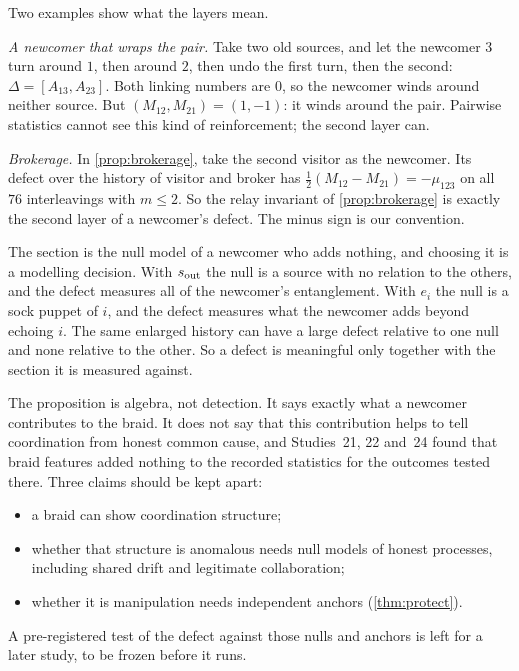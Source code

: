 \documentclass[11pt]{article}
\theoremstyle{definition}\newtheorem{definition}[theorem]{Definition}\newtheorem{remark}[theorem]{Remark}\newtheorem{example}[theorem]{Example}\newtheorem{problem}[theorem]{Open problem}\crefname{problem}{Problem}{Problems}
\begin{document}
Two examples show what the layers mean.

\emph{A newcomer that wraps the pair.} Take two old sources, and let the newcomer $3$ turn around $1$, then around $2$, then undo the first turn, then the second: $\Delta=[A_{13},A_{23}]$. Both linking numbers are $0$, so the newcomer winds around neither source. But $(M_{12},M_{21})=(1,-1)$: it winds around the pair. Pairwise statistics cannot see this kind of reinforcement; the second layer can.

\emph{Brokerage.} In \cref{prop:brokerage}, take the second visitor as the newcomer. Its defect over the history of visitor and broker has $\tfrac12(M_{12}-M_{21})=-\mu_{123}$ on all $76$ interleavings with $m\le2$. So the relay invariant of \cref{prop:brokerage} is exactly the second layer of a newcomer's defect. The minus sign is our convention.

The section is the null model of a newcomer who adds nothing, and choosing it is a modelling decision. With $s_{\rm out}$ the null is a source with no relation to the others, and the defect measures all of the newcomer's entanglement. With $e_i$ the null is a sock puppet of $i$, and the defect measures what the newcomer adds beyond echoing $i$. The same enlarged history can have a large defect relative to one null and none relative to the other. So a defect is meaningful only together with the section it is measured against.

The proposition is algebra, not detection. It says exactly what a newcomer contributes to the braid. It does not say that this contribution helps to tell coordination from honest common cause, and Studies~21, 22 and~24 found that braid features added nothing to the recorded statistics for the outcomes tested there. Three claims should be kept apart:
\begin{itemize}
\item a braid can show coordination structure;
\item whether that structure is anomalous needs null models of honest processes, including shared drift and legitimate collaboration;
\item whether it is manipulation needs independent anchors (\cref{thm:protect}).
\end{itemize}
A pre-registered test of the defect against those nulls and anchors is left for a later study, to be frozen before it runs.
\end{document}
